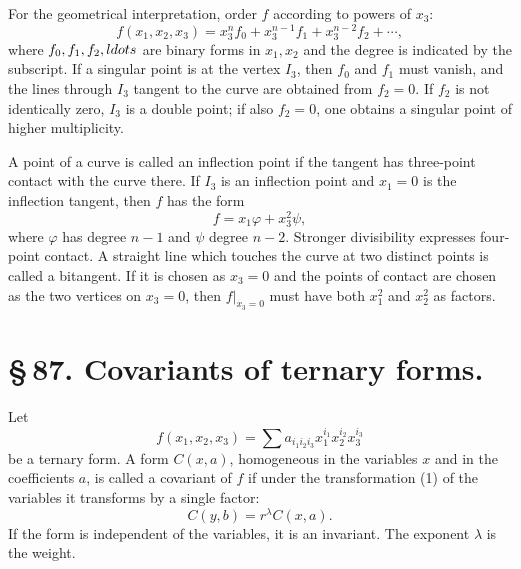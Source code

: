 \documentclass[11pt]{article}
\begin{document}
For the geometrical interpretation, order $f$ according to powers of $x_3$:
\begin{equation}
 f(x_1,x_2,x_3)=x_3^n f_0+x_3^{n-1}f_1+x_3^{n-2}f_2+\cdots,
 \tag{3}
\end{equation}
where $f_0,f_1,f_2,\\ldots$ are binary forms in $x_1,x_2$ and the degree is indicated by the subscript. If a singular point is at the vertex $I_3$, then $f_0$ and $f_1$ must vanish, and the lines through $I_3$ tangent to the curve are obtained from $f_2=0$. If $f_2$ is not identically zero, $I_3$ is a double point; if also $f_2=0$, one obtains a singular point of higher multiplicity.

A point of a curve is called an inflection point if the tangent has three-point contact with the curve there. If $I_3$ is an inflection point and $x_1=0$ is the inflection tangent, then $f$ has the form
\begin{equation}
 f=x_1\varphi+x_3^2\psi,
 \tag{4}
\end{equation}
where $\varphi$ has degree $n-1$ and $\psi$ degree $n-2$. Stronger divisibility expresses four-point contact. A straight line which touches the curve at two distinct points is called a bitangent. If it is chosen as $x_3=0$ and the points of contact are chosen as the two vertices on $x_3=0$, then $f\vert_{x_3=0}$ must have both $x_1^2$ and $x_2^2$ as factors.

\section*{\S\,87. Covariants of ternary forms.}

Let
\[
 f(x_1,x_2,x_3)=\sum a_{i_1i_2i_3}x_1^{i_1}x_2^{i_2}x_3^{i_3}
\]
be a ternary form. A form $C(x,a)$, homogeneous in the variables $x$ and in the coefficients $a$, is called a covariant of $f$ if under the transformation (1) of the variables it transforms by a single factor:
\begin{equation}
 C(y,b)=r^\lambda C(x,a).
 \tag{1}
\end{equation}
If the form is independent of the variables, it is an invariant. The exponent $\lambda$ is the weight.
\end{document}
